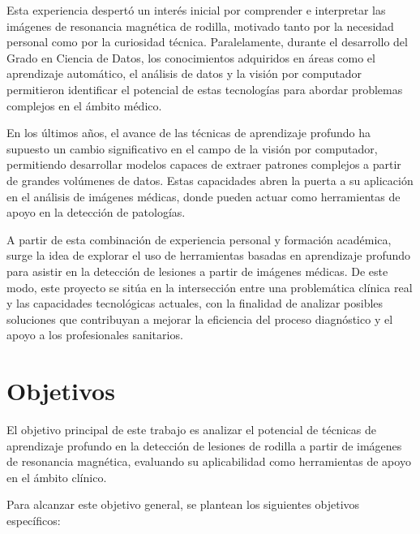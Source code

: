 Esta experiencia despertó un interés inicial por comprender e interpretar las imágenes de resonancia magnética de rodilla, motivado tanto por la necesidad personal como por la curiosidad técnica. Paralelamente, durante el desarrollo del Grado en Ciencia de Datos, los conocimientos adquiridos en áreas como el aprendizaje automático, el análisis de datos y la visión por computador permitieron identificar el potencial de estas tecnologías para abordar problemas complejos en el ámbito médico.

En los últimos años, el avance de las técnicas de aprendizaje profundo ha supuesto un cambio significativo en el campo de la visión por computador, permitiendo desarrollar modelos capaces de extraer patrones complejos a partir de grandes volúmenes de datos. Estas capacidades abren la puerta a su aplicación en el análisis de imágenes médicas, donde pueden actuar como herramientas de apoyo en la detección de patologías.

A partir de esta combinación de experiencia personal y formación académica, surge la idea de explorar el uso de herramientas basadas en aprendizaje profundo para asistir en la detección de lesiones a partir de imágenes médicas. De este modo, este proyecto se sitúa en la intersección entre una problemática clínica real y las capacidades tecnológicas actuales, con la finalidad de analizar posibles soluciones que contribuyan a mejorar la eficiencia del proceso diagnóstico y el apoyo a los profesionales sanitarios.


\section{Objetivos}

El objetivo principal de este trabajo es analizar el potencial de técnicas de aprendizaje profundo en la detección de lesiones de rodilla a partir de imágenes de resonancia magnética, evaluando su aplicabilidad como herramientas de apoyo en el ámbito clínico.

Para alcanzar este objetivo general, se plantean los siguientes objetivos específicos:

